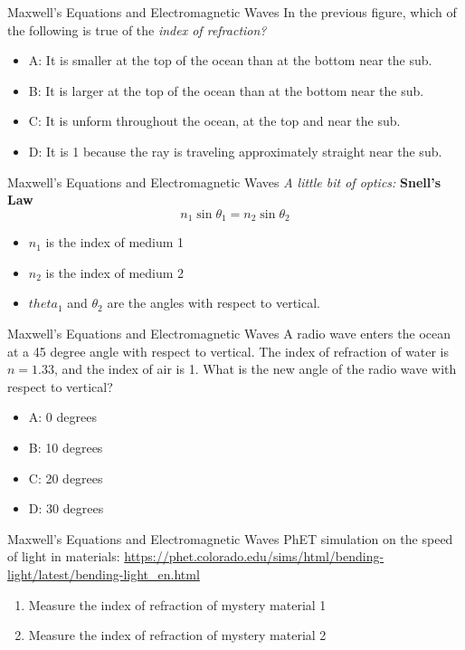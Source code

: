 \documentclass{beamer}
\begin{document}
\begin{frame}{Maxwell's Equations and Electromagnetic Waves}
In the previous figure, which of the following is true of the \textit{index of refraction?}
\begin{itemize}
\item A: It is smaller at the top of the ocean than at the bottom near the sub.
\item B: It is larger at the top of the ocean than at the bottom near the sub.
\item C: It is unform throughout the ocean, at the top and near the sub.
\item D: It is 1 because the ray is traveling approximately straight near the sub.
\end{itemize}
\end{frame}

\begin{frame}{Maxwell's Equations and Electromagnetic Waves}
\textit{A little bit of optics:} \textbf{Snell's Law}
\begin{equation}
n_1 \sin\theta_1 = n_2 \sin\theta_2
\end{equation}
\begin{itemize}
\item $n_1$ is the index of medium 1
\item $n_2$ is the index of medium 2
\item $theta_1$ and $\theta_2$ are the angles with respect to vertical.
\end{itemize}
\end{frame}

\begin{frame}{Maxwell's Equations and Electromagnetic Waves}
A radio wave enters the ocean at a 45 degree angle with respect to vertical.  The index of refraction of water is $n = 1.33$, and the index of air is 1.  What is the new angle of the radio wave with respect to vertical?
\begin{itemize}
\item A: 0 degrees
\item B: 10 degrees
\item C: 20 degrees
\item D: 30 degrees
\end{itemize}
\end{frame}

\begin{frame}{Maxwell's Equations and Electromagnetic Waves}
PhET simulation on the speed of light in materials:
\url{https://phet.colorado.edu/sims/html/bending-light/latest/bending-light_en.html}
\begin{enumerate}
\item Measure the index of refraction of mystery material 1
\item Measure the index of refraction of mystery material 2
\end{enumerate}
\end{frame}
\end{document}
